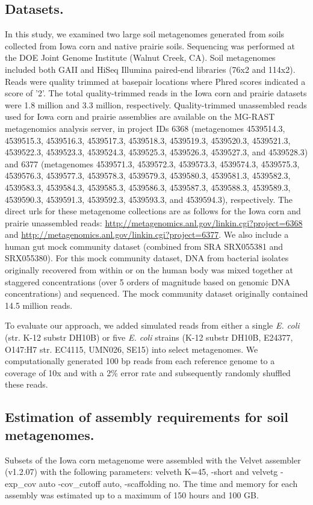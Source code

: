 \documentclass{pnastwo}
\begin{document}
\begin{article}
\subsection*{Datasets.}
In this study, we examined two large soil metagenomes generated from
soils collected from Iowa corn and native prairie soils.  Sequencing
was performed at the DOE Joint Genome Institute (Walnut Creek, CA).  Soil metagenomes included both
GAII and HiSeq Illumina paired-end libraries (76x2 and 114x2).  
Reads were quality trimmed at basepair locations where Phred scores indicated a score of
'2'.  The total quality-trimmed reads in the Iowa corn and prairie
datasets were 1.8 million and 3.3 million, respectively.  Quality-trimmed unassembled reads used for Iowa corn and prairie assemblies are available on the MG-RAST metagenomics analysis server, in project IDs 6368 (metagenomes 
4539514.3, 
4539515.3, 
4539516.3, 
4539517.3, 
4539518.3, 
4539519.3, 
4539520.3, 
4539521.3, 
4539522.3, 
4539523.3, 
4539524.3, 
4539525.3, 
4539526.3, 
4539527.3, and
4539528.3) 
and 6377 (metagenomes  4539571.3, 
4539572.3, 
4539573.3, 
4539574.3, 
4539575.3, 
4539576.3, 
4539577.3, 
4539578.3, 
4539579.3, 
4539580.3, 
4539581.3, 
4539582.3, 
4539583.3, 
4539584.3, 
4539585.3, 
4539586.3, 
4539587.3, 
4539588.3, 
4539589.3, 
4539590.3, 
4539591.3, 
4539592.3, 
4539593.3, and
4539594.3), respectively.  The direct urls for these metagenome collections are as follows for the Iowa corn and prairie unassembled reads:  \url{http://metagenomics.anl.gov/linkin.cgi?project=6368} and \url{http://metagenomics.anl.gov/linkin.cgi?project=6377}.
We also
include a human gut mock community dataset (combined from SRA
SRX055381 and SRX055380).  For this mock community dataset, DNA from
bacterial isolates originally recovered from within or on the human
body was mixed together at staggered concentrations (over 5 orders of
magnitude based on genomic DNA concentrations) and sequenced.  The
mock community dataset originally contained 14.5 million reads.

To evaluate our approach, we added simulated reads from either a
single \emph{E. coli} (str. K-12 substr DH10B) or five \emph{E. coli} strains (K-12
substr DH10B, E24377, O147:H7 str. EC4115, UMN026, SE15) into select
metagenomes.  We computationally generated 100 bp reads from each
reference genome to a coverage of 10x and with a 2\% error rate and
subsequently randomly shuffled these reads.

\subsection*{Estimation of assembly requirements for soil metagenomes.}
Subsets of the Iowa corn metagenome were assembled with the Velvet
assembler (v1.2.07) with the following parameters: velveth K=45,
-short and velvetg -exp\_cov auto -cov\_cutoff auto, -scaffolding no.
The time and memory for each assembly was estimated up to a maximum of
150 hours and 100 GB.


\end{article}
\end{document}
